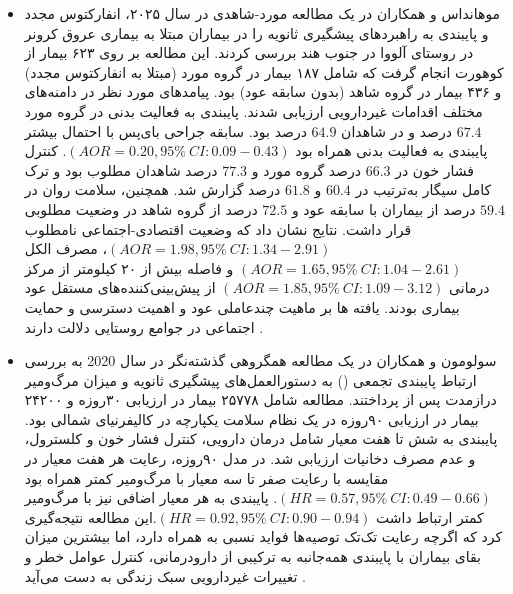 \begin{itemize}
\item موهانداس و همکاران در یک مطالعه مورد-شاهدی در سال ۲۰۲۵، انفارکتوس مجدد و پایبندی به راهبردهای پیشگیری ثانویه را در بیماران مبتلا به بیماری عروق کرونر در روستای آلووا در جنوب هند بررسی کردند. این مطالعه بر روی ۶۲۳ بیمار از کوهورت  انجام گرفت که شامل ۱۸۷ بیمار در گروه مورد (مبتلا به انفارکتوس مجدد) و ۴۳۶ بیمار در گروه شاهد (بدون سابقه عود) بود. پیامدهای مورد نظر در دامنه‌های مختلف اقدامات غیردارویی ارزیابی شدند. پایبندی به فعالیت بدنی در گروه مورد $67.4$ درصد و در شاهدان $64.9$ درصد بود. سابقه جراحی بای‌پس با احتمال بیشتر پایبندی به فعالیت بدنی همراه بود $(AOR=0.20, 95\%\ CI: 0.09-0.43)$. کنترل فشار خون در $66.3$ درصد گروه مورد و $77.3$ درصد شاهدان مطلوب بود و ترک کامل سیگار به‌ترتیب در $60.4$ و $61.8$ درصد گزارش شد. همچنین، سلامت روان در $59.4$ درصد از بیماران با سابقه عود و $72.5$ درصد از گروه شاهد در وضعیت مطلوبی قرار داشت. نتایج نشان داد که وضعیت اقتصادی-‌اجتماعی نامطلوب $(AOR=1.98, 95\%\ CI: 1.34-2.91)$، مصرف الکل $(AOR=1.65, 95\%\ CI: 1.04-2.61)$ و فاصله بیش از ۲۰ کیلومتر از مرکز درمانی $(AOR=1.85, 95\%\ CI: 1.09-3.12)$ از پیش‌بینی‌کننده‌های مستقل عود بیماری بودند. یافته ها بر ماهیت چندعاملی عود و اهمیت دسترسی و حمایت اجتماعی در جوامع روستایی دلالت دارند \cite{Mohandas2025RecurrentMI}.

\item سولومون و همکاران در یک مطالعه‌ همگروهی گذشته‌نگر در سال 2020 به بررسی ارتباط پایبندی تجمعی () به دستورالعمل‌های پیشگیری ثانویه و میزان مرگ‌ومیر درازمدت پس از  پرداختند. مطالعه شامل ۲۵۷۷۸ بیمار در ارزیابی ۳۰روزه و ۲۴۲۰۰ بیمار در ارزیابی ۹۰روزه در یک نظام سلامت یکپارچه در کالیفرنیای شمالی بود. پایبندی به شش تا هفت معیار شامل درمان دارویی، کنترل فشار خون و کلسترول، و عدم مصرف دخانیات ارزیابی شد. در مدل ۹۰روزه، رعایت هر هفت معیار در مقایسه با رعایت صفر تا سه معیار با مرگ‌ومیر کمتر همراه بود $(HR=0.57, 95\%\ CI: 0.49-0.66)$. پایبندی به هر معیار اضافی نیز با مرگ‌ومیر کمتر ارتباط داشت $(HR=0.92, 95\%\ CI: 0.90-0.94)$.این مطالعه نتیجه‌گیری کرد که اگرچه رعایت تک‌تک توصیه‌ها فواید نسبی به همراه دارد، اما بیشترین میزان بقای بیماران با پایبندی همه‌جانبه به ترکیبی از دارودرمانی، کنترل عوامل خطر و تغییرات غیردارویی سبک زندگی به دست می‌آید \cite{Solomon2020CumulativeAdherence}.
\end{itemize}